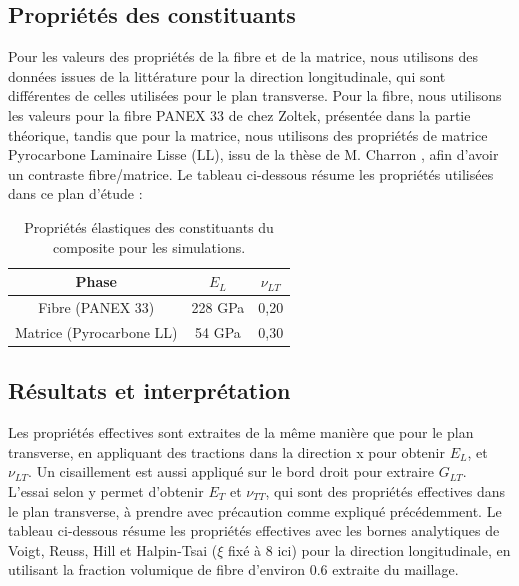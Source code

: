 \documentclass[a4paper,11pt]{article}
\begin{document}
\subsection{Propriétés des constituants}
Pour les valeurs des propriétés de la fibre et de la matrice, nous utilisons des données issues de la littérature pour la direction longitudinale, qui sont différentes de celles utilisées pour le plan transverse. Pour la fibre, nous utilisons les valeurs pour la fibre PANEX 33 de chez Zoltek, présentée dans la partie théorique, tandis que pour la matrice, nous utilisons des propriétés de matrice Pyrocarbone Laminaire Lisse (LL), issu de la thèse de M. Charron \cite{CharronCC}, afin d'avoir un contraste fibre/matrice. Le tableau ci-dessous résume les propriétés utilisées dans ce plan d'étude : 

\begin{table}[H]
\centering
\small
\renewcommand{\arraystretch}{1.2}
\begin{tabular}{|c|c|c|}
\hline
\textbf{Phase} & \textbf{$E_L$} & \textbf{$\nu_{LT}$} \\
\hline
Fibre (PANEX 33)  & 228 GPa & 0,20 \\
Matrice (Pyrocarbone LL)& 54 GPa & 0,30 \\
\hline
\end{tabular}
\caption{Propriétés élastiques des constituants du composite pour les simulations.}
\label{tab:properties_longi}
\end{table}

\subsection{Résultats et interprétation}
Les propriétés effectives sont extraites de la même manière que pour le plan transverse, en appliquant des tractions dans la direction x pour obtenir $E_L$, et $\nu_{LT}$. Un cisaillement est aussi appliqué sur le bord droit pour extraire $G_{LT}$. L'essai selon y permet d'obtenir $E_T$ et $\nu_{TT}$, qui sont des propriétés effectives dans le plan transverse, à prendre avec précaution comme expliqué précédemment. Le tableau ci-dessous résume les propriétés effectives avec les bornes analytiques de Voigt, Reuss, Hill et Halpin-Tsai ($\xi$ fixé à 8 ici) pour la direction longitudinale, en utilisant la fraction volumique de fibre d'environ 0.6 extraite du maillage.
\end{document}
